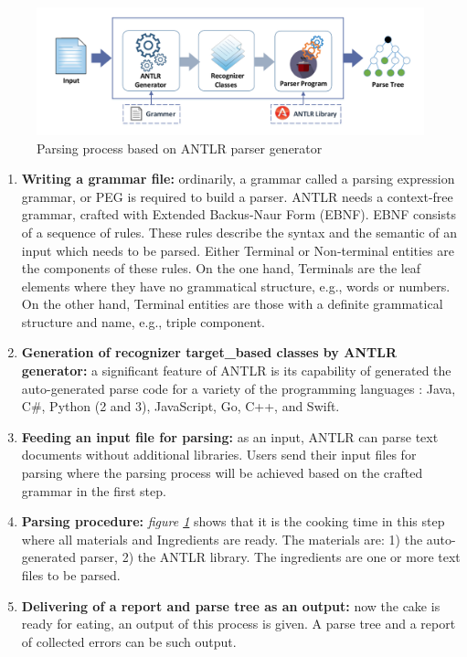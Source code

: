 \begin{figure}[ht]
	\begin{center}
		\includegraphics[scale=0.6]{images/ANTLR}
		\caption{Parsing process based on ANTLR parser generator}
		\label{Fig:ANTLR}
	\end{center}
\end{figure}


\begin{enumerate}
		
		\item  {\bf Writing a grammar file:} ordinarily, a grammar called a parsing expression grammar, or PEG is required to build a parser. ANTLR needs a context-free grammar, crafted with Extended Backus-Naur Form (EBNF). EBNF consists of a sequence of rules. These rules describe the syntax and the semantic of an input which needs to be parsed. Either Terminal or Non-terminal entities are the components of these rules. On the one hand, Terminals are the leaf elements where they have no grammatical structure, e.g., words or numbers. On the other hand, Terminal entities are those with a definite grammatical structure and name, e.g., triple component. 
		\item {\bf Generation of recognizer target\_based classes by ANTLR generator:} a significant feature of ANTLR is its capability of generated the auto-generated parse code for  a variety of the programming languages \citealp{ANTLR:Website:Online}: Java, C\#, Python (2 and 3), JavaScript, Go, C++, and Swift.
		\item {\bf Feeding an input file for parsing:} as an input, ANTLR can parse text documents without additional libraries. Users send their input files for parsing where the parsing process will be achieved based on the crafted grammar in the first step.
		\item {\bf Parsing procedure:} {\it figure \ref{Fig:ANTLR} } shows that it is the cooking time in this step where all materials and Ingredients are ready. The materials are: 1) the auto-generated parser, 2) the ANTLR library. The ingredients are one or more text files to be parsed. 
		\item {\bf Delivering of a report and parse tree as an output:} now the cake is ready for eating, an output of this process is given. A parse tree and a report of collected errors can be such output.
	\end{enumerate}











